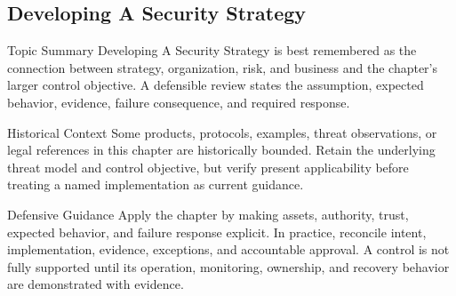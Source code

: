 \documentclass[11pt,letterpaper]{article}
\begin{document}
\subsection*{Developing A Security Strategy}
\begin{CornellNotesTable}
\end{CornellNotesTable}
\begin{CornellSummaryBox}{Topic Summary}
Developing A Security Strategy is best remembered as the connection between strategy, organization, risk, and business and the chapter's larger control objective. A defensible review states the assumption, expected behavior, evidence, failure consequence, and required response.
\end{CornellSummaryBox}
\begin{CornellWarningBox}{Historical Context}
Some products, protocols, examples, threat observations, or legal references in this chapter are historically bounded. Retain the underlying threat model and control objective, but verify present applicability before treating a named implementation as current guidance.
\end{CornellWarningBox}
\begin{CornellOverviewBox}{Defensive Guidance}
Apply the chapter by making assets, authority, trust, expected behavior, and failure response explicit. In practice, reconcile intent, implementation, evidence, exceptions, and accountable approval. A control is not fully supported until its operation, monitoring, ownership, and recovery behavior are demonstrated with evidence.
\end{CornellOverviewBox}
\end{document}
